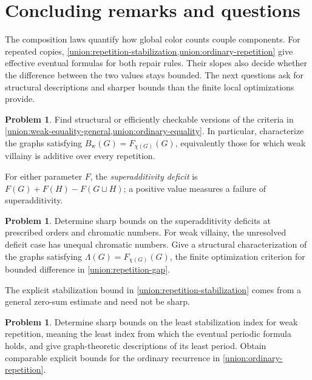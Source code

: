 \documentclass[11pt,reqno]{amsart}
\numberwithin{equation}{section}
\theoremstyle{definition}
\newtheorem{problem}[theorem]{Problem}
\theoremstyle{remark}
\begin{document}
\section{Concluding remarks and questions}\label{sec:questions}

The composition laws quantify how global color counts couple components.
For repeated copies, \cref{union:repetition-stabilization,union:ordinary-repetition}
give effective eventual formulas for both repair rules. Their slopes
also decide whether the difference between the two values stays bounded.
The next questions ask for structural descriptions and sharper bounds
than the finite local optimizations provide.

\begin{problem}\label{problem:union-equality}
Find structural or efficiently checkable versions of the criteria in
\cref{union:weak-equality-general,union:ordinary-equality}.
In particular, characterize the graphs satisfying
$B_{\mathrm w}(G)=F_{\chi(G)}(G)$, equivalently those for which weak
villainy is additive over every repetition.
\end{problem}

For either parameter $F$, the \emph{superadditivity deficit} is
$F(G)+F(H)-F(G\sqcup H)$; a positive value measures a failure of
superadditivity.

\begin{problem}\label{problem:union-deficits}
Determine sharp bounds on the superadditivity deficits at prescribed
orders and chromatic numbers. For weak villainy, the unresolved deficit
case has unequal chromatic numbers.
Give a structural characterization of the graphs satisfying
$\Lambda(G)=F_{\chi(G)}(G)$, the finite optimization criterion for
bounded difference in \cref{union:repetition-gap}.
\end{problem}

The explicit stabilization bound in \cref{union:repetition-stabilization}
comes from a general zero-sum estimate and need not be sharp.
\begin{problem}\label{problem:repetition-onset}
Determine sharp bounds on the least stabilization index for weak
repetition, meaning the least index from which the eventual periodic
formula holds, and give graph-theoretic descriptions of its least period.
Obtain comparable explicit bounds for the ordinary recurrence in
\cref{union:ordinary-repetition}.
\end{problem}
\end{document}
